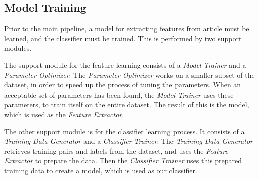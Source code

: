 \subsection{Model Training}
Prior to the main pipeline, a model for extracting features from article must be learned, and the classifier must be trained. This is performed by two support modules.

The support module for the feature learning consists of a \emph{Model Trainer} and a \emph{Parameter Optimizer}. The \emph{Parameter Optimizer} works on a smaller subset of the dataset, in order to speed up the process of tuning the parameters. When an acceptable set of parameters has been found, the \emph{Model Trainer} uses these parameters, to train itself on the entire dataset. The result of this is the model, which is used as the \emph{Feature Extractor}.

The other support module is for the classifier learning process. It consists of a \emph{Training Data Generator} and a \emph{Classifier Trainer}. The \emph{Training Data Generator} retrieves training pairs and labels from the dataset, and uses the \emph{Feature Extractor} to prepare the data. Then the \emph{Classifier Trainer} uses this prepared training data to create a model, which is used as our classifier.












